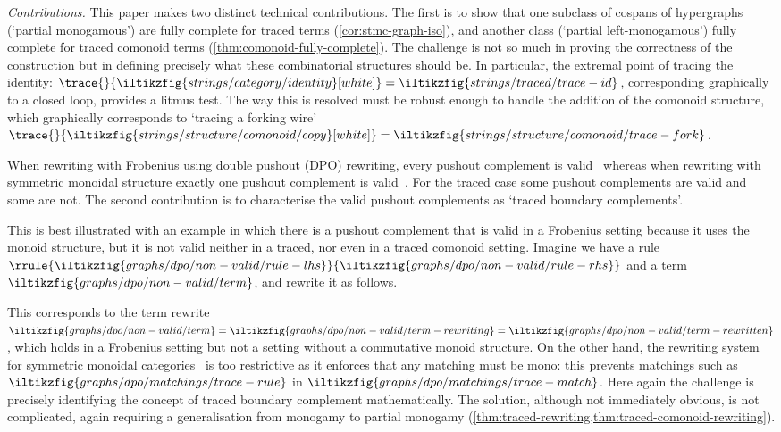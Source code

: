 \emph{Contributions.}
This paper makes two distinct technical contributions.
The first is to show that one subclass of cospans of hypergraphs (`partial
monogamous') are fully complete for traced terms (\cref{cor:stmc-graph-iso}),
and another class (`partial left-monogamous') fully complete for traced comonoid
terms (\cref{thm:comonoid-fully-complete}).
The challenge is not so much in proving the correctness of the construction but
in defining precisely what these combinatorial structures should be.
In particular, the extremal point of tracing the identity: \(
    \trace{}{
        \iltikzfig{strings/category/identity}[white]
    }
    =
    \iltikzfig{strings/traced/trace-id}
\), corresponding graphically to a closed loop, provides a litmus test.
The way this is resolved must be robust enough to handle the addition of the
comonoid structure, which graphically corresponds to `tracing a forking wire' \(
    \trace{}{
        \iltikzfig{strings/structure/comonoid/copy}[white]
    }
    =
    \iltikzfig{strings/structure/comonoid/trace-fork}
\).

When rewriting with Frobenius using double pushout (DPO) rewriting, every
pushout complement is valid~\cite{bonchi2022string} whereas when rewriting with
symmetric monoidal structure exactly one pushout complement is
valid~\cite{bonchi2022stringa}.
For the traced case some pushout complements are valid and some are not.
The second contribution is to characterise the valid pushout complements as
`traced boundary complements'.

This is best illustrated with an example in which there is a pushout
complement that is valid in a Frobenius setting because it uses the monoid
structure, but it is not valid neither in a traced, nor even in a traced
comonoid setting.
Imagine we have a rule \(\rrule{
    \iltikzfig{graphs/dpo/non-valid/rule-lhs}
}{
    \iltikzfig{graphs/dpo/non-valid/rule-rhs}
}\) and a term \(
    \iltikzfig{graphs/dpo/non-valid/term}
\), and rewrite it as follows.
\begin{center}
    
\end{center}
This corresponds to the term rewrite \(
    \iltikzfig{graphs/dpo/non-valid/term}
    =
    \iltikzfig{graphs/dpo/non-valid/term-rewriting}
    =
    \iltikzfig{graphs/dpo/non-valid/term-rewritten}
\), which holds in a Frobenius setting but not a setting without a commutative
monoid structure.
On the other hand, the rewriting system for symmetric monoidal
categories~\cite{bonchi2022stringa} is too restrictive as it enforces that any
matching must be mono: this prevents matchings such as \(
    \iltikzfig{graphs/dpo/matchings/trace-rule}
\) in \(
    \iltikzfig{graphs/dpo/matchings/trace-match}
\).
Here again the challenge is precisely identifying the concept of traced boundary
complement mathematically.
The solution, although not immediately obvious, is not complicated, again
requiring a generalisation from monogamy to partial monogamy
(\cref{thm:traced-rewriting,thm:traced-comonoid-rewriting}).
